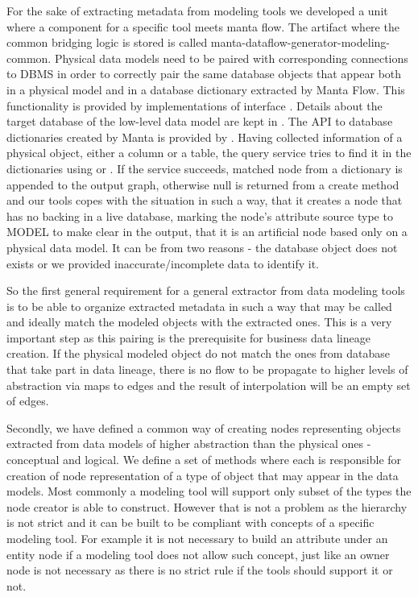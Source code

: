 For the sake of extracting metadata from modeling tools we developed a unit where a component for a specific tool meets manta flow.
The artifact where the common bridging logic is stored is called manta-dataflow-generator-modeling-common.
Physical data models need to be paired with corresponding connections to DBMS in order to correctly pair the same database objects that appear both in a physical model and in a database dictionary extracted by Manta Flow. This functionality is provided by implementations of interface . Details about the target database of the low-level data model are kept in . The API to database dictionaries created by Manta is provided by . 
Having collected information of a physical object, either a column or a table, the query service tries to find it in the dictionaries using  or . 
If the service succeeds, matched node from a dictionary is appended to the output graph, otherwise null is returned from a create method and our tools copes with the situation in such a way, that it creates a node that has no backing in a live database, marking the node's attribute source type to MODEL to make clear in the output, that it is an artificial node based only on a physical data model. It can be from two reasons - the database object does not exists or we provided inaccurate/incomplete data to identify it.

So the first general requirement for a general extractor from data modeling tools is to be able to organize extracted metadata in such a way that  may be called and ideally match the modeled objects with the extracted ones.
This is a very important step as this pairing is the prerequisite for business data lineage creation. If the physical modeled object do not match the ones from database that take part in data lineage, there is no flow to be propagate to higher levels of abstraction via maps to edges and the result of interpolation will be an empty set of edges.

Secondly, we have defined a common way of creating nodes representing objects extracted from data models of higher abstraction than the physical ones - conceptual and logical.
We define a set of methods where each is responsible for creation of node representation of a type of object that may appear in the data models. Most commonly a modeling tool will support only subset of the types the node creator is able to construct. However that is not a problem as the hierarchy is not strict and it can be built to be compliant with concepts of a specific modeling tool. 
For example it is not necessary to build an attribute under an entity node if a modeling tool does not allow such concept, just like an owner node is not necessary as there is no strict rule if the tools should support it or not.

